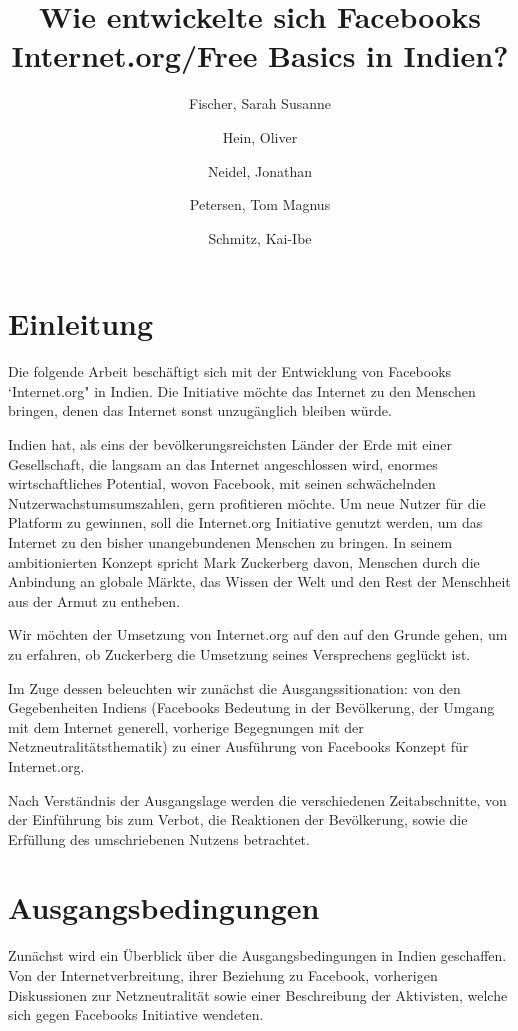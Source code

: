 \documentclass{article}
\title{Wie entwickelte sich Facebooks Internet.org/Free Basics in Indien?}
\author{
  Fischer, Sarah Susanne\\
  \and
  Hein, Oliver\\
  \and
  Neidel, Jonathan\\
  \and
  Petersen, Tom Magnus\\
  \and
  Schmitz, Kai-Ibe\\
}
\begin{document}
\maketitle

\section{Einleitung}

Die folgende Arbeit beschäftigt sich mit der Entwicklung von Facebooks `Internet.org" in Indien. Die Initiative möchte das Internet zu den Menschen bringen, denen das Internet sonst unzugänglich bleiben würde.

\medskip

Indien hat, als eins der bevölkerungsreichsten Länder der Erde mit einer Gesellschaft, die langsam an das Internet angeschlossen wird, enormes wirtschaftliches Potential,
wovon Facebook, mit seinen schwächelnden Nutzerwachstumsumszahlen, gern profitieren möchte.
Um neue Nutzer für die Platform zu gewinnen, soll die Internet.org Initiative genutzt werden, um das Internet zu den bisher unangebundenen Menschen zu bringen.
In seinem ambitionierten Konzept spricht Mark Zuckerberg davon, Menschen durch die Anbindung an globale Märkte, das Wissen der Welt und den Rest der Menschheit aus der Armut zu entheben.

\medskip

Wir möchten der Umsetzung von Internet.org auf den auf den Grunde gehen, um zu erfahren, ob Zuckerberg die Umsetzung seines Versprechens geglückt ist.

Im Zuge dessen beleuchten wir zunächst die Ausgangssitionation: von den Gegebenheiten Indiens (Facebooks Bedeutung in der Bevölkerung, der Umgang mit dem Internet generell, vorherige Begegnungen mit der Netzneutralitätsthematik) zu einer Ausführung von Facebooks Konzept für Internet.org.

Nach Verständnis der Ausgangslage werden die verschiedenen Zeitabschnitte, von der Einführung bis zum Verbot, die Reaktionen der Bevölkerung, sowie die Erfüllung des umschriebenen Nutzens betrachtet.
\break

\tableofcontents
\break

\section{Ausgangsbedingungen}

Zunächst wird ein Überblick über die Ausgangsbedingungen in Indien geschaffen. Von der Internetverbreitung, ihrer Beziehung zu Facebook, vorherigen Diskussionen zur Netzneutralität sowie einer Beschreibung der Aktivisten, welche sich gegen Facebooks Initiative wendeten.
\end{document}

